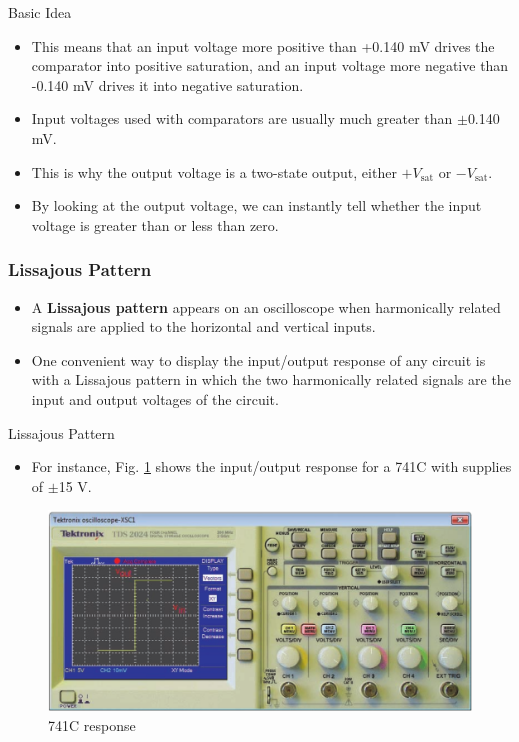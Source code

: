 \documentclass[pdflatex,compress]{beamer}
\begin{document}
\begin{frame}{Basic Idea}
	\begin{itemize}
		\item This means that an input voltage more positive than +0.140 mV drives the comparator into positive saturation, and an input voltage more negative than -0.140 mV drives it into negative saturation.
		\item Input voltages used with comparators are usually much greater than
		$\pm$0.140 mV.
		\item This is why the output voltage is a two-state output, either $+V_{\text{sat}}$ or $-V_{\text{sat}}$.
		\item By looking at the output voltage, we can instantly tell whether the input voltage is greater than or less than zero.
	\end{itemize}
\end{frame}

\begin{frame}
	\frametitle{Lissajous Pattern}
	\begin{itemize}
		\item A \textbf{Lissajous pattern} appears on an oscilloscope when harmonically related signals are applied to the horizontal and vertical inputs.
		\item One convenient way to display the input/output response of any circuit is with a Lissajous pattern in which the two harmonically related signals are the input and output voltages of the circuit.
	\end{itemize}
\end{frame}

\begin{frame}{Lissajous Pattern}
	\begin{itemize}
		\item For instance, Fig. \ref{fig:img03} shows the input/output response for a 741C with supplies of $\pm$15 V.
	\end{itemize}
	\begin{figure}
		\centering
		\includegraphics[width=\linewidth]{img/img03}
		\caption{741C response}
		\label{fig:img03}
	\end{figure}
\end{frame}
\end{document}
